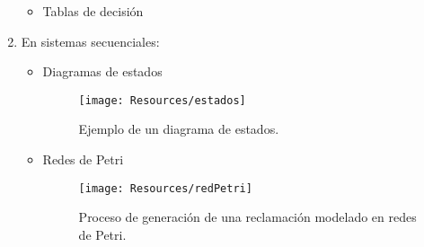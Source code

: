 \begin{enumerate}
\begin{itemize}
              \item Tablas de decisión
                    \begin{table}[h!]
                        \centering
                        \caption{Ejemplo de tabla de decisiones de un proceso.}
                    \end{table}
          \end{itemize}
    \item En sistemas secuenciales:
          \begin{itemize}
              \item Diagramas de estados
                    \begin{figure}[h!]
                        \centering
                        \texttt{[image: Resources/estados]}
                        \caption{Ejemplo de un diagrama de estados.}
                    \end{figure}

              \item Redes de Petri
                    \begin{figure}[H]
                        \centering
                        \texttt{[image: Resources/redPetri]}
                        \caption{Proceso de generación de una reclamación modelado en redes de Petri.}
                    \end{figure}
          \end{itemize}
\end{enumerate}





